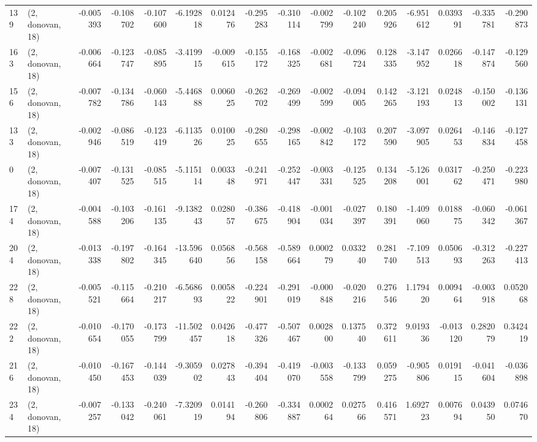 \begin{tabular}{llrrrrrrrrrrrrrr}
139 &  (2, donovan, 18) &  -0.005393 & -0.108702 & -0.107600 &   -6.192818 &  0.012476 &  -0.295283 & -0.310114 & -0.002799 & -0.102240 &  0.205926 &   -6.951612 &  0.039391 & -0.335781 & -0.290873 \\
163 &  (2, donovan, 18) &  -0.006664 & -0.123747 & -0.085895 &   -3.419915 & -0.009615 &  -0.155172 & -0.168325 & -0.002681 & -0.096724 &  0.128335 &   -3.147952 &  0.026618 & -0.147874 & -0.129560 \\
156 &  (2, donovan, 18) &  -0.007782 & -0.134786 & -0.060143 &   -5.446888 &  0.006025 &  -0.262702 & -0.269499 & -0.002599 & -0.094005 &  0.142265 &   -3.121193 &  0.024813 & -0.150002 & -0.136131 \\
133 &  (2, donovan, 18) &  -0.002946 & -0.086519 & -0.123419 &   -6.113526 &  0.010025 &  -0.280655 & -0.298165 & -0.002842 & -0.103172 &  0.207590 &   -3.097905 &  0.026453 & -0.146834 & -0.127458 \\
0   &  (2, donovan, 18) &  -0.007407 & -0.131525 & -0.085515 &   -5.115114 &  0.003348 &  -0.241971 & -0.252447 & -0.003331 & -0.125525 &  0.134208 &   -5.126001 &  0.031762 & -0.250471 & -0.223980 \\
174 &  (2, donovan, 18) &  -0.004588 & -0.103206 & -0.161135 &   -9.138243 &  0.028057 &  -0.386675 & -0.418904 & -0.001034 & -0.027397 &  0.180391 &   -1.409060 &  0.018875 & -0.060342 & -0.061367 \\
204 &  (2, donovan, 18) &  -0.013338 & -0.197802 & -0.164345 &  -13.596640 &  0.056856 &  -0.568158 & -0.589664 &  0.000279 &  0.033240 &  0.281740 &   -7.109513 &  0.050693 & -0.312263 & -0.227413 \\
228 &  (2, donovan, 18) &  -0.005521 & -0.115664 & -0.210217 &   -6.568693 &  0.005822 &  -0.224901 & -0.291019 & -0.000848 & -0.020216 &  0.276546 &    1.179420 &  0.009464 & -0.003918 &  0.052068 \\
222 &  (2, donovan, 18) &  -0.010654 & -0.170055 & -0.173799 &  -11.502457 &  0.042618 &  -0.477326 & -0.507467 &  0.002800 &  0.137540 &  0.372611 &    9.019336 & -0.013120 &  0.282079 &  0.342419 \\
216 &  (2, donovan, 18) &  -0.010450 & -0.167453 & -0.144039 &   -9.305902 &  0.027843 &  -0.394404 & -0.419070 & -0.003558 & -0.133799 &  0.059275 &   -0.905806 &  0.019115 & -0.041604 & -0.036898 \\
234 &  (2, donovan, 18) &  -0.007257 & -0.133042 & -0.240061 &   -7.320919 &  0.014194 &  -0.260806 & -0.334887 &  0.000264 &  0.027566 &  0.416571 &    1.692723 &  0.007694 &  0.043950 &  0.074670 \\

\end{tabular}
